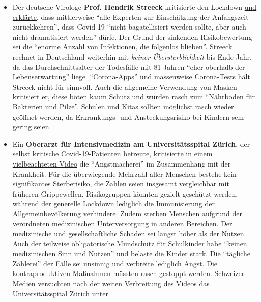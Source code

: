 \begin{itemize}
\tightlist
\item
  Der deutsche Virologe \textbf{Prof. Hendrik Streeck} kritisierte den
  Lockdown
  \href{https://www.welt.de/wissenschaft/article209299157/Corona-Krise-Virologe-Streeck-kritisiert-deutschen-Lockdown.html}{und
  erklärte}, dass mittlerweise ``alle Experten zur Einschätzung der
  Anfangszeit zurückkehren'', dass Covid-19 ``nicht bagatellisiert
  werden sollte, aber auch nicht dramatisiert werden'' dürfe. Der Grund
  der sinkenden Risiko­bewertung sei die ``enorme Anzahl von
  Infektionen, die folgenlos blieben''. Streeck rechnet in Deutschland
  weiterhin mit \emph{keiner Über­sterb­lichkeit} bis Ende Jahr, da das
  Durch­schnitts­alter der Todesfälle mit 81 Jahren ``eher oberhalb der
  Lebens­erwartung'' liege. ``Corona-Apps'' und massenweise Corona-Tests
  hält Streeck nicht für sinnvoll. Auch die allgemeine Verwendung von
  Masken kritisiert er, diese böten kaum Schutz und würden rasch zum
  ``Nährboden für Bakterien und Pilze''. Schulen und Kitas sollten
  möglichst rasch wieder geöffnet werden, da Erkrankungs- und
  Ansteckungsrisiko bei Kindern sehr gering seien.
\item
  Ein \textbf{Oberarzt für Intensivmedizin am Universitätsspital
  Zürich}, der selbst kritische Covid-19-Patienten betreute, kritisierte
  in einem
  \href{https://www.medinside.ch/de/post/corona-intensivmediziner-spricht-klartext}{vielbeachteten
  Video} die ``Angstmacherei'' im Zusammenhang mit der Krankheit. Für
  die überwiegende Mehrzahl aller Menschen bestehe kein signifikantes
  Sterberisiko, die Zahlen seien insgesamt vergleichbar mit früheren
  Grippewellen. Risikogruppen könnten gezielt geschützt werden, während
  der generelle Lockdown lediglich die Immunisierung der
  Allgemeinbevölkerung verhindere. Zudem sterben Menschen aufgrund der
  verordneten medizinischen Unterversorgung in anderen Bereichen. Der
  medizinische und gesellschaftliche Schaden sei längst höher als der
  Nutzen. Auch der teilweise obligatorische Mundschutz für Schulkinder
  habe ``keinen medizinischen Sinn und Nutzen'' und belaste die Kinder
  stark. Die ``tägliche Zählerei'' der Fälle sei unsinnig und verbreite
  lediglich Angst. Die kontraproduktiven Maßnahmen müssten rasch
  gestoppt werden. Schweizer Medien versuchten nach der weiten
  Verbreitung des Videos das Universitätsspital Zürich
  \href{https://www.blick.ch/news/schweiz/unispital-distanziert-sich-von-umstrittenen-aussagen-corona-kritiker-feiern-videobotschaft-von-zuercher-oberarzt-id15903859.html}{unter
}
\end{itemize}
